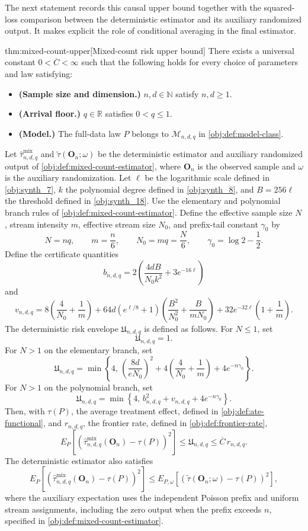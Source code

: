 \documentclass[11pt]{article}
\begin{document}
The next statement records this causal upper bound together with the squared-loss comparison between the deterministic estimator and its auxiliary randomized output. It makes explicit the role of conditional averaging in the final estimator.

\begin{theoremv}{thm:mixed-count-upper}[Mixed-count risk upper bound]
There exists a universal constant \(0<\overline C<\infty\) such that the following holds for every choice of parameters and law satisfying:
\begin{itemize}
\item \textbf{(Sample size and dimension.)} \(n,d\in\mathbb N\) satisfy \(n,d\ge1\).
\item \textbf{(Arrival floor.)} \(q\in\mathbb R\) satisfies \(0<q\le1\).
\item \textbf{(Model.)} The full-data law \(P\) belongs to \(\mathcal M_{n,d,q}\) in \cref{obj:def:model-class}.
\end{itemize}
Let \(\widehat\tau^{\mathrm{mix}}_{n,d,q}\) and \(\widetilde\tau(\mathbf O_n;\omega)\) be the deterministic estimator and auxiliary randomized output of \cref{obj:def:mixed-count-estimator}, where \(\mathbf O_n\) is the observed sample and \(\omega\) is the auxiliary randomization. Let \(\ell\) be the logarithmic scale defined in \cref{obj:synth_7}, \(k\) the polynomial degree defined in \cref{obj:synth_8}, and \(B=256\ell\) the threshold defined in \cref{obj:synth_18}. Use the elementary and polynomial branch rules of \cref{obj:def:mixed-count-estimator}. Define the effective sample size \(N\), stream intensity \(m\), effective stream size \(N_0\), and prefix-tail constant \(\gamma_0\) by
\[
N=nq,\qquad m=\frac n6,\qquad N_0=mq=\frac N6,
\qquad \gamma_0=\log 2-\frac12.
\]
Define the certificate quantities
\[
b_{n,d,q}
=
2\left(\frac{4dB}{N_0k^2}+3e^{-16\ell}\right)
\]
and
\[
v_{n,d,q}
=
8\left(\frac4{N_0}+\frac1m\right)
+
64d\left(e^{\ell/8}+1\right)
\left(\frac{B^2}{N_0^2}+\frac{B}{mN_0}\right)
+
32e^{-32\ell}\left(1+\frac1m\right).
\]
The deterministic risk envelope \(\mathfrak U_{n,d,q}\) is defined as follows. For \(N\le1\), set
\[
\mathfrak U_{n,d,q}=1.
\]
For \(N>1\) on the elementary branch, set
\[
\mathfrak U_{n,d,q}
=
\min\left\{
4,\,
\left(\frac{8d}{eN_0}\right)^2
+4\left(\frac4{N_0}+\frac1m\right)
+4e^{-n\gamma_0}
\right\}.
\]
For \(N>1\) on the polynomial branch, set
\[
\mathfrak U_{n,d,q}
=
\min\left\{
4,\,
b_{n,d,q}^2+v_{n,d,q}+4e^{-n\gamma_0}
\right\}.
\]
Then, with \(\tau(P)\), the average treatment effect, defined in \cref{obj:def:ate-functional}, and \(r_{n,d,q}\), the frontier rate, defined in \cref{obj:def:frontier-rate},
\[
E_P\!\left[
\left(
\widehat\tau^{\mathrm{mix}}_{n,d,q}(\mathbf O_n)-\tau(P)
\right)^2
\right]
\le
\mathfrak U_{n,d,q}
\le
\overline C\,r_{n,d,q}.
\]
The deterministic estimator also satisfies
\[
E_P\!\left[
\left(
\widehat\tau^{\mathrm{mix}}_{n,d,q}(\mathbf O_n)-\tau(P)
\right)^2
\right]
\le
E_{P,\omega}\!\left[
\left(
\widetilde\tau(\mathbf O_n;\omega)-\tau(P)
\right)^2
\right],
\]
where the auxiliary expectation uses the independent Poisson prefix and uniform stream assignments, including the zero output when the prefix exceeds \(n\), specified in \cref{obj:def:mixed-count-estimator}.
\end{theoremv}
\end{document}
